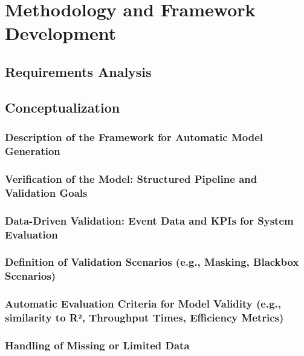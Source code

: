 \chapter{Methodology and Framework Development}
\label{chap:methodology}

\section{Requirements Analysis}

\section{Conceptualization}
\subsection{Description of the Framework for Automatic Model Generation}
\subsection{Verification of the Model: Structured Pipeline and Validation Goals}
\subsection{Data-Driven Validation: Event Data and KPIs for System Evaluation}
\subsection{Definition of Validation Scenarios (e.g., Masking, Blackbox Scenarios)}
\subsection{Automatic Evaluation Criteria for Model Validity (e.g., similarity to R², Throughput Times, Efficiency Metrics)}
\subsection{Handling of Missing or Limited Data}

\cite{waswani2017attention}